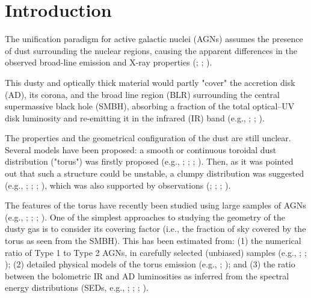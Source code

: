 \documentclass[]{aa}
\begin{document}
\section{Introduction} \label{sec:intro}

The unification paradigm for active galactic nuclei (AGNs) assumes the presence of dust surrounding the nuclear regions, causing the apparent differences in the observed broad-line emission and X-ray properties (\citealt{Anto}; \citealt{GhiHa}; \citealt{UrPad}).

This dusty and optically thick material would partly "cover" the accretion disk (AD), its corona, and the broad line region (BLR) surrounding the central supermassive black hole (SMBH), absorbing a fraction of the total optical--UV disk luminosity and re-emitting it in the infrared (IR) band (e.g., \citealt{Reesetal}; \citealt{Neugetal}; \citealt{Barva}).

The properties and the geometrical configuration of the dust are still unclear. Several models have been proposed: a smooth or continuous toroidal dust distribution ("torus") was firstly proposed (e.g., \citealt{PierKro}; \citealt{GraDan}; \citealt{Schart}; \citealt{Fritz}). Then, as it was pointed out that such a structure could be unstable, a clumpy distribution was suggested (e.g., \citealt{KroBeg}; \citealt{Tac94}; \citealt{Nenka, Nenkb}; \citealt{HonKish}), which was also supported by observations (\citealt{Risa}; \citealt{Jaffe}; \citealt{Trist}; \citealt{Zhao}).

The features of the torus have recently been studied using large samples of AGNs (e.g., \citealt{Caldero12}; \citealt{MaWa}; \citealt{Hao}; \citealt{Merloni}). One of the simplest approaches to studying the geometry of the dusty gas is to consider its covering factor (i.e., the fraction of sky covered by the torus as seen from the SMBH). This has been estimated from: (1) the numerical ratio of Type 1 to Type 2 AGNs, in carefully selected (unbiased) samples (e.g., \citealt{LawElv}; \citealt{Law}; \citealt{Simp}); (2) detailed physical models of the torus emission (e.g., \citealt{Ezhi}; \citealt{Zhuang}); and (3) the ratio between the bolometric IR and AD luminosities as inferred from the spectral energy distributions (SEDs, e.g., \citealt{Alonso}; \citealt{Caldero12}; \citealt{CastiDe}; \citealt{Toba}). 
\end{document}
